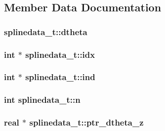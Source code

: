 \subsection{\-Member \-Data \-Documentation}
\hypertarget{structsplinedata__t_a9c027d34817c91f4ecb9cff67066215c}{
\subsubsection[{dtheta}]{ {\bf splinedata\-\_\-t\-::dtheta}}}\label{structsplinedata__t_a9c027d34817c91f4ecb9cff67066215c}
\hypertarget{structsplinedata__t_a3fb4637364000e0161a6c9d05de2013b}{
\subsubsection[{idx}]{\setlength{\rightskip}{0pt plus 5cm}int $\ast$ {\bf splinedata\-\_\-t\-::idx}}}\label{structsplinedata__t_a3fb4637364000e0161a6c9d05de2013b}
\hypertarget{structsplinedata__t_a78f732f5e13dbad487d6bcc7506495d6}{
\subsubsection[{ind}]{\setlength{\rightskip}{0pt plus 5cm}int $\ast$ {\bf splinedata\-\_\-t\-::ind}}}\label{structsplinedata__t_a78f732f5e13dbad487d6bcc7506495d6}
\hypertarget{structsplinedata__t_a629e34902157e899332f14475fa19587}{
\subsubsection[{n}]{\setlength{\rightskip}{0pt plus 5cm}int {\bf splinedata\-\_\-t\-::n}}}\label{structsplinedata__t_a629e34902157e899332f14475fa19587}
\hypertarget{structsplinedata__t_aae3ba219aa493497b29eda90f7871c6b}{
\subsubsection[{ptr\-\_\-dtheta\-\_\-z}]{\setlength{\rightskip}{0pt plus 5cm}real $\ast$ {\bf splinedata\-\_\-t\-::ptr\-\_\-dtheta\-\_\-z}}}\label{structsplinedata__t_aae3ba219aa493497b29eda90f7871c6b}
